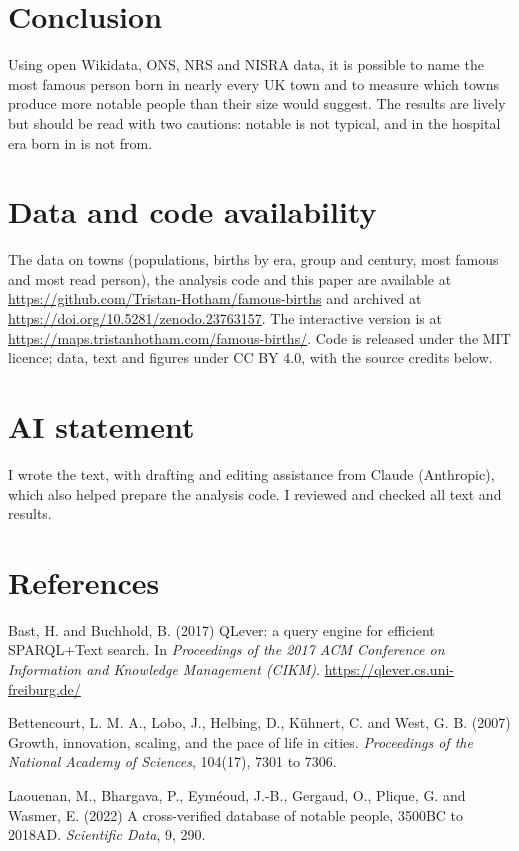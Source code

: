 \documentclass[11pt,a4paper]{article}
\begin{document}
\section{Conclusion}

Using open Wikidata, ONS, NRS and NISRA data, it is possible to name the most famous person born in nearly every UK town and to measure which towns produce more notable people than their size would suggest. The results are lively but should be read with two cautions: notable is not typical, and in the hospital era born in is not from.

\section*{Data and code availability}

The data on towns (populations, births by era, group and century, most famous and most read person), the analysis code and this paper are available at \url{https://github.com/Tristan-Hotham/famous-births} and archived at \url{https://doi.org/10.5281/zenodo.23763157}. The interactive version is at \url{https://maps.tristanhotham.com/famous-births/}. Code is released under the MIT licence; data, text and figures under CC BY 4.0, with the source credits below.

\section*{AI statement}

I wrote the text, with drafting and editing assistance from Claude (Anthropic), which also helped prepare the analysis code. I reviewed and checked all text and results.

\section*{References}
\small
\setlength{\parskip}{0.35em}

Bast, H. and Buchhold, B. (2017) QLever: a query engine for efficient SPARQL+Text search. In \emph{Proceedings of the 2017 ACM Conference on Information and Knowledge Management (CIKM)}. \url{https://qlever.cs.uni-freiburg.de/}

Bettencourt, L. M. A., Lobo, J., Helbing, D., Kühnert, C. and West, G. B. (2007) Growth, innovation, scaling, and the pace of life in cities. \emph{Proceedings of the National Academy of Sciences}, 104(17), 7301 to 7306.

Laouenan, M., Bhargava, P., Eyméoud, J.-B., Gergaud, O., Plique, G. and Wasmer, E. (2022) A cross-verified database of notable people, 3500BC to 2018AD. \emph{Scientific Data}, 9, 290.
\end{document}
